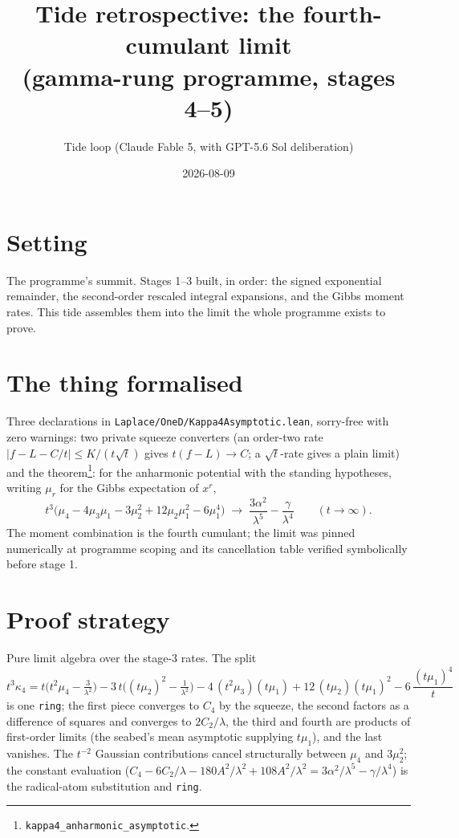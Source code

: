 \documentclass[11pt]{article}
\title{Tide retrospective: the fourth-cumulant limit\\
(gamma-rung programme, stages 4--5)}
\author{Tide loop (Claude Fable 5, with GPT-5.6 Sol deliberation)}
\date{2026-08-09}
\begin{document}
\maketitle

\section{Setting}

The programme's summit. Stages 1--3 built, in order: the signed
exponential remainder, the second-order rescaled integral expansions,
and the Gibbs moment rates. This tide assembles them into the limit the
whole programme exists to prove.

\section{The thing formalised}

Three declarations in \texttt{Laplace/OneD/Kappa4Asymptotic.lean},
sorry-free with zero warnings: two private squeeze converters (an
order-two rate $|f - L - C/t| \leq K/(t\sqrt t)$ gives
$t(f - L) \to C$; a $\sqrt t$-rate gives a plain limit) and the
theorem\footnote{\texttt{kappa4\_anharmonic\_asymptotic}.}: for the
anharmonic potential with the standing hypotheses, writing $\mu_r$ for
the Gibbs expectation of $x^r$,
\[
t^3\bigl(\mu_4 - 4\mu_3\mu_1 - 3\mu_2^2 + 12\mu_2\mu_1^2 - 6\mu_1^4\bigr)
\;\longrightarrow\;
\frac{3\alpha^2}{\lambda^5} - \frac{\gamma}{\lambda^4}
\qquad (t \to \infty).
\]
The moment combination is the fourth cumulant; the limit was pinned
numerically at programme scoping and its cancellation table verified
symbolically before stage 1.

\section{Proof strategy}

Pure limit algebra over the stage-3 rates. The split
\[
t^3\kappa_4 = t\bigl(t^2\mu_4 - \tfrac{3}{\lambda^2}\bigr)
- 3\,t\bigl((t\mu_2)^2 - \tfrac{1}{\lambda^2}\bigr)
- 4\,(t^2\mu_3)(t\mu_1) + 12\,(t\mu_2)(t\mu_1)^2
- 6\,\frac{(t\mu_1)^4}{t}
\]
is one \texttt{ring}; the first piece converges to $C_4$ by the squeeze,
the second factors as a difference of squares and converges to
$2C_2/\lambda$, the third and fourth are products of first-order limits
(the seabed's mean asymptotic supplying $t\mu_1$), and the last
vanishes. The $t^{-2}$ Gaussian contributions cancel structurally
between $\mu_4$ and $3\mu_2^2$; the constant evaluation
($C_4 - 6C_2/\lambda - 180A^2/\lambda^2 + 108A^2/\lambda^2 =
3\alpha^2/\lambda^5 - \gamma/\lambda^4$) is the radical-atom
substitution and \texttt{ring}.
\end{document}
